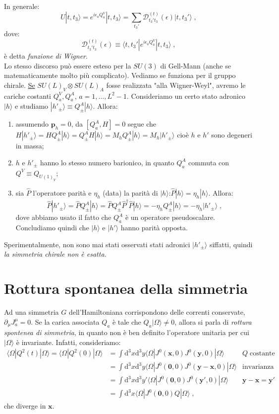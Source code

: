 \documentclass[12pt,a4paper]{article}
\theoremstyle{definition}
\newcommand{\diff}[1][]{\mathrm{d}#1}
\newcommand{\bra}{\langle}
\newcommand{\ket}{\rangle}
\newcommand{\adj}[1]{#1^{\dagger}}
\numberwithin{equation}{section}
\begin{document}
In generale:
\begin{equation}
\hat{U}|t,t_3\ket=e^{i\epsilon_aQ_a^V}|t,t_3\ket=\sum_{t_3'}\mathcal{D}^{(t)}_{t_3't_3}(\epsilon)|t,t_3'\ket\;,
\end{equation}
dove:
\begin{equation}
\mathcal{D}^{(t)}_{t_3't_3}(\epsilon)\equiv\bra t,t_3'|e^{i\epsilon_aQ_a^V}|t,t_3\ket\;,
\end{equation}
è detta \emph{funzione di Wigner}.\\
Lo stesso discorso può essere esteso per la $SU(3)$ di Gell-Mann (anche se matematicamente molto più complicato). Vediamo se funziona per il gruppo chirale. \underline{Se} $SU(L)_V\otimes SU(L)_A$ fosse realizzata "alla Wigner-Weyl", avremo le cariche costanti $Q_a^V,Q_a^A$, $a=1,\ldots,L^2-1$. Consideriamo un certo stato adronico $|h\ket$ e studiamo $|h'_{\pm}\ket\equiv Q^A_{\pm}|h\ket$. Allora:
\begin{enumerate}
\item assumendo $\mathbf{p}_h=0$, da $[Q_a^A,H]=0$ segue che $H|h'_{\pm}\ket=HQ^A_{\pm}|h\ket=Q^A_{\pm}H|h\ket=M_hQ^A_{\pm}|h\ket=M_h|h'_{\pm}\ket$ cioè $h$ e $h'$ sono degeneri in massa;
\item $h$ e $h'_{\pm}$ hanno lo stesso numero barionico, in quanto $Q_a^A$ commuta con $Q^V\equiv Q_{U(1)_V}$;
\item sia $\hat{P}$ l'operatore parità e $\eta_h$ (data) la parità di $|h\ket$:$\hat{P}|h\ket=\eta_h|h\ket$. Allora:
$$
\hat{P}|h'_{\pm}\ket=\hat{P}Q_{\pm}^A|h\ket=\hat{P}Q_{\pm}^A\adj{\hat{P}}\hat{P}|h\ket=-\eta_hQ_{\pm}^A|h\ket=-\eta_h|h'_{\pm}\ket\;,
$$
dove abbiamo usato il fatto che $Q_a^A$ è un operatore pseudoscalare. Concludiamo quindi che $|h\ket$ e $|h'\ket$ hanno parità opposta.
\end{enumerate}
Sperimentalmente, non sono mai stati osservati stati adronici $|h'_{\pm}\ket$ siffatti, quindi \emph{la simmetria chirale non è esatta.}
\cleardoublepage
\section{Rottura spontanea della simmetria}
Ad una simmetria $G$ dell'Hamiltoniana corrispondono delle correnti conservate, $\partial_{\mu}J^{\mu}_a=0$. Se la carica associata $Q_a$ è tale che $Q_a|\Omega\ket\ne 0$, allora si parla di \emph{rottura spontenea di simmetria}, in quanto non è ben definito l'operatore unitaria per cui $|\Omega\ket$ è invariante. Infatti, consideriamo:
\begin{align*}
\bra \Omega|Q^2(t)|\Omega\ket = \bra\Omega|Q^2(0)|\Omega\ket &=\int\diff^3{x}\diff^3{y}\bra\Omega|J^0(\mathbf{x},0)J^0(\mathbf{y},0)|\Omega\ket  & Q\;\mbox{costante} \\
&= \int\diff^3{x}\diff^3{y}\bra\Omega|J^0(\mathbf{0},0)J^0(\mathbf{y}-\mathbf{x},0)|\Omega\ket  &\mbox{invarianza per traslazioni} \\
&= \int\diff^3{x}\diff^3{y'}\bra\Omega|J^0(\mathbf{0},0)J^0(\mathbf{y}',0)|\Omega\ket & \mathbf{y}-\mathbf{x}=\mathbf{y}' \\
&=\int\diff^3{x}\bra\Omega|J^0(\mathbf{0},0)Q|\Omega\ket\;,
\end{align*}
che diverge in $\mathbf{x}$.
\end{document}
